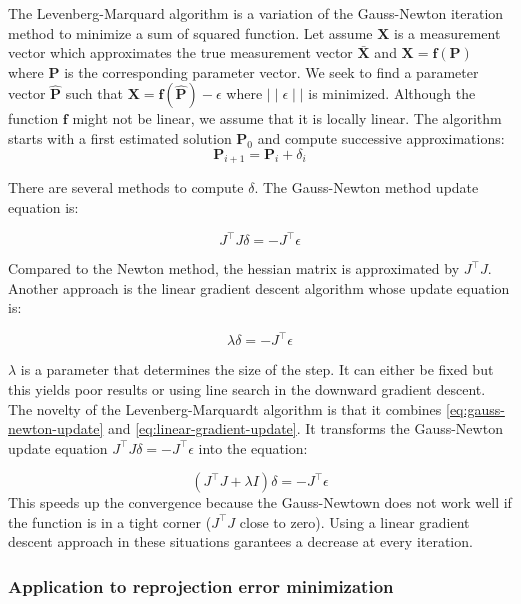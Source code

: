 \documentclass[12pt]{article}
\begin{document}
The Levenberg-Marquard algorithm is a variation of the Gauss-Newton iteration method to minimize a sum of squared function. Let assume $\mathbf{X}$ is a measurement vector which approximates the true measurement vector $\bar{\mathbf{X}}$ and $\mathbf{X} = \mathbf{f}(\mathbf{P})$ where $\mathbf{P}$ is the corresponding parameter vector. We seek to find a parameter vector $\widehat{\mathbf{P}}$ such that $\mathbf{X} = \mathbf{f}(\widehat{\mathbf{P}}) - \epsilon$ where $\mid\mid\epsilon\mid\mid$ is minimized. Although the function $\mathbf{f}$ might not be linear, we assume that it is locally linear. The algorithm starts with a first estimated solution $\mathbf{P}_0$ and compute successive approximations:
\[
  \mathbf{P}_{i+1} = \mathbf{P}_i + \delta_i
\] 

There are several methods to compute $\delta$. The Gauss-Newton method update equation is: 

\begin{equation}
  \label{eq:gauss-newton-update}
  J^\top J\delta = -J^\top \epsilon
\end{equation}

Compared to the Newton method, the hessian matrix is approximated by $J^\top J$. Another approach is the linear gradient descent algorithm whose update equation is:

\begin{equation}
  \label{eq:linear-gradient-update}
 \lambda \delta = -J^\top \epsilon
\end{equation}

$\lambda$ is a parameter that determines the size of the step. It can either be fixed but this yields poor results or using line search in the downward gradient descent. The novelty of the Levenberg-Marquardt algorithm is that it combines \ref{eq:gauss-newton-update} and \ref{eq:linear-gradient-update}. It transforms the Gauss-Newton update equation $J^\top J\delta = -J^\top \epsilon$ into the equation:

\begin{equation}
  \label{eq:lm_update}
  (J^\top J + \lambda I)\delta = -J^\top \epsilon
\end{equation}
 This speeds up the convergence because the Gauss-Newtown does not work well if the function is in a tight corner ($J^\top J$ close to zero). Using a linear gradient descent approach in these situations garantees a decrease at every iteration.


\subsubsection{Application to reprojection error minimization}
\end{document}
